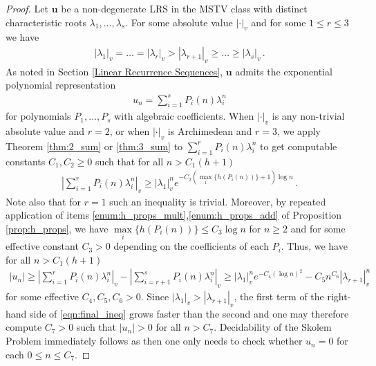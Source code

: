 \documentclass{article}\usepackage[a4paper,margin=20mm]{geometry}
\newcommand{\LRS}[1]{{\bm{#1}}}
\begin{document}
\begin{proof}
Let $\LRS{u}$ be a non-degenerate LRS in the MSTV class with distinct characteristic roots $\lambda_1, \dots , \lambda_s$. For some absolute value $|\cdot|_v$ and for some $1 \leq r \leq 3$ we have 
\begin{align*}
|\lambda_1|_v = \dots = |\lambda_r|_v > |\lambda_{r+1}|_v \geq \dots \geq |\lambda_s|_v \, .
\end{align*}
As noted in Section \ref{Linear Recurrence Sequences}, $\LRS{u}$ admits the exponential polynomial representation
\begin{align}\label{Exp_sum}
    u_n = \sum_{i=1}^s P_i(n) \lambda_i^n 
\end{align}
for polynomials $P_1, \dots , P_s$ with algebraic coefficients. When $|\cdot|_v$ is any non-trivial absolute value and $r = 2$, or when $|\cdot|_v$ is Archimedean and $r=3$, we apply Theorem \ref{thm:2_sum} or \ref{thm:3_sum} to $\sum_{i=1}^r P_i(n) \lambda_i^n$ to get computable constants $C_1,C_2 \geq 0$ such that for all $n > C_1(h+1)$
\begin{align*}
\left| \sum_{i=1}^r P_i(n) \lambda_i^n \right|_v \geq |\lambda_1|_v^n e^{-C_2 \left(\underset{i} \max \{h(P_i(n))\} + 1 \right) \log n} \, .
\end{align*}
Note also that for $r=1$ such an inequality is trivial. Moreover, by repeated application of items \ref{enum:h_props_mult},\ref{enum:h_props_add} of Proposition \ref{prop:h_props}, we have $\underset{i}{\max} \{h(P_i(n))\} \leq C_3 \log n$ for $n\geq 2$ and for some effective constant $C_3 >0$ depending on the coefficients of each $P_i$. Thus, we have for all $n > C_1(h+1)$
\begin{align} \label{eqn:final_ineq}
|u_n| \geq \left| \sum_{i=1}^r P_i(n) \lambda_i^n \right|_v - \left| \sum_{i=r+1}^s P_i(n) \lambda_i^n \right|_v \geq |\lambda_1|_v^n e^{-C_4 (\log n)^2} - C_5 n^{C_6}|\lambda_{r+1}|_v^n
\end{align}
for some effective $C_4,C_5,C_6 > 0$. Since $|\lambda_1|_v > |\lambda_{r+1}|_v$, the first term of the right-hand side of \eqref{eqn:final_ineq} grows faster than the second and one may therefore compute $C_7 >0$ such that $|u_n| > 0$ for all $n > C_7$. Decidability of the Skolem Problem immediately follows as then one only needs to check whether $u_n = 0$ for each $0 \leq n \leq C_7$.
\end{proof}
\end{document}
